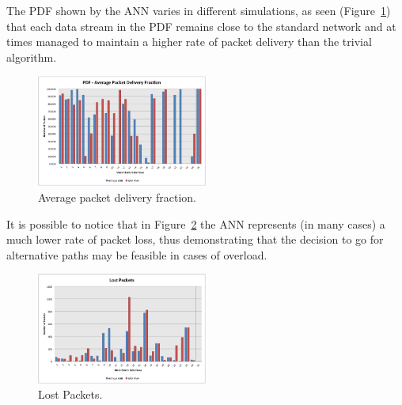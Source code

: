 \documentclass[10pt, conference, compsocconf]{IEEEtran}
\begin{document}





The PDF shown by the ANN varies in different simulations, as seen (Figure~\ref{fig:g11}) that each data stream in the PDF remains close to the standard network and at times managed to maintain a higher rate of packet delivery than the trivial algorithm.

\begin{figure}[h]
	\centering
	\includegraphics[width=0.5\textwidth]{./graphics/image011.png}
    \caption{ Average packet delivery fraction.}
    \label{fig:g11}
\end{figure}

It is possible to notice that in Figure~\ref{fig:g12} the ANN represents (in many cases) a much lower rate of packet loss, thus demonstrating that the decision to go for alternative paths may be feasible in cases of overload.

\begin{figure}[h]
	\centering
	\includegraphics[width=0.5\textwidth]{./graphics/image012.png}
    \caption{ Lost Packets.}
    \label{fig:g12}
\end{figure}
\end{document}
